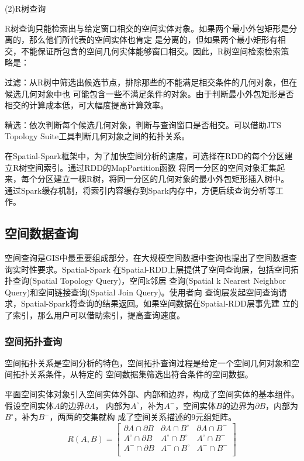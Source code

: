 (2)R树查询

R树查询只能检索出与给定窗口相交的空间实体对象。如果两个最小外包矩形是分离的，那么他们所代表的空间实体也肯定
是分离的，但如果两个最小矩形有相交，不能保证所包含的空间几何实体能够窗口相交。因此，R树空间检索检索策
略是：

过滤：从R树中筛选出候选节点，排除那些的不能满足相交条件的几何对象，但在候选几何对象中也
可能包含一些不满足条件的对象。由于判断最小外包矩形是否相交的计算成本低，可大幅度提高计算效率。

精选：依次判断每个候选几何对象，判断与查询窗口是否相交。可以借助JTS Topology Suite工具判断几何对象之间的拓扑关系。

在Spatial-Spark框架中，为了加快空间分析的速度，可选择在RDD的每个分区建立R树空间索引。通过RDD的MapPartition函数
将同一分区的空间对象汇集起来，每个分区建立一棵R树，将同一分区的几何对象的最小外包矩形插入树中。
通过Spark缓存机制，将索引内容缓存到Spark内存中，方便后续查询分析等工作。

\subsection{空间数据查询}

空间查询是GIS中最重要组成部分，在大规模空间数据中查询也提出了空间数据查询实时性要求。Spatial-Spark
在Spatial-RDD上层提供了空间查询层，包括空间拓扑查询(Spatial Topology Query)，空间k邻居
查询(Spatial k Nearest Neighbor Query)和空间链接查询(Spatial Join Query)。使用者向
查询层发起空间查询请求，Spatial-Spark将查询的结果返回。如果空间数据在Spatial-RDD层事先建
立的了索引，那么用户可以借助索引，提高查询速度。

\subsubsection{空间拓扑查询}
空间拓扑关系是空间分析的特色，空间拓扑查询过程是给定一个空间几何对象和空间拓扑关系条件，从特定的
空间数据集筛选出符合条件的空间数据。

平面空间实体对象引入空间实体外部、内部和边界，构成了空间实体的基本组件。假设空间实体$A$的边界$\partial A$，
内部为$A^{\circ}$，补为$A^{-}$，空间实体$B$的边界为$\partial B$，内部为$B^{\circ}$，补为$B^{-}$，两两的交集就构
成了空间关系描述的9元组矩阵\cite{谢俊平2012拓扑关系和方向关系的统一表达模型}。
\[ R(A,B) = 
\begin{bmatrix}
\partial A \cap \partial B & \partial A \cap B^{\circ} & \partial A \cap B^{-} \\
A^{\circ} \cap \partial B & A^{\circ} \cap B^{\circ} & A^{\circ} \cap B^{-} \\
A^{-} \cap \partial B & A^{-} \cap B^{\circ} & A^{-} \cap B^{-} \\
\end{bmatrix}
\]

